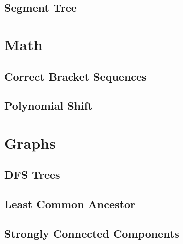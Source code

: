 \documentclass[12pt]{article}
\begin{document}
\subsection{Segment Tree} 


\section{Math}

\subsection{Correct Bracket Sequences} 
\subsection{Polynomial Shift} 


\section{Graphs}

\subsection{DFS Trees} 
\subsection{Least Common Ancestor} 
\subsection{Strongly Connected Components} 
\end{document}
